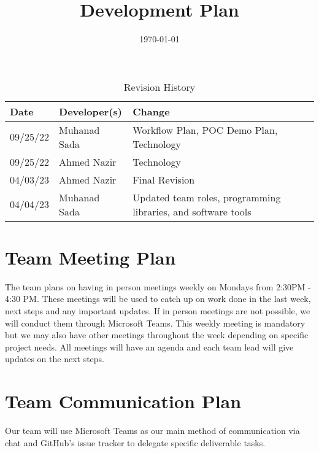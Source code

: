 \documentclass[12pt]{article}
\date{}
\begin{document}
\title{Development Plan\\\progname}

\author{\authname}
\date{\today}

\maketitle
\newpage

\begin{table}[hp]
\caption{Revision History} \label{TblRevisionHistory}
\begin{tabularx}{\textwidth}{llX}
\toprule
\textbf{Date} & \textbf{Developer(s)} & \textbf{Change}\\
\midrule
09/25/22 & Muhanad Sada & Workflow Plan, POC Demo Plan, Technology\\
09/25/22 & Ahmed Nazir & Technology\\
04/03/23 & Ahmed Nazir & Final Revision\\
04/04/23 & Muhanad Sada & Updated team roles, programming libraries, and software tools \\
\bottomrule
\end{tabularx}
\end{table}

\newpage
\tableofcontents
\listoftables

\newpage




\section{Team Meeting Plan}
The team plans on having in person meetings weekly on Mondays from 2:30PM - 4:30 PM. These meetings will be used to catch up on work done in the last week, next steps and any important updates. If in person meetings are not possible, we will conduct them through Microsoft Teams. This weekly meeting is mandatory but we may also have other meetings throughout the week depending on specific project needs. All meetings will have an agenda and each team lead will give updates on the next steps. 

\section{Team Communication Plan}
Our team will use Microsoft Teams as our main method of communication via chat and GitHub's issue tracker to delegate specific deliverable tasks.
\end{document}
